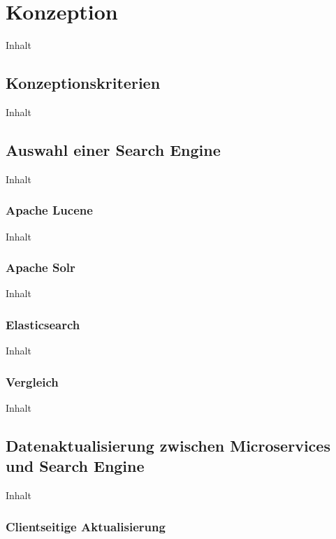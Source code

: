 \chapter{Konzeption\label{chap4:Viertes-Kapitel}}

Inhalt

\section{Konzeptionskriterien\label{sec4.1:Unterpunkt-1}}

Inhalt

\section{Auswahl einer Search Engine\label{sec4.2:Unterpunkt-2}}

Inhalt

\subsection{Apache Lucene\label{subsec4.2.1:Unterunterpunkt-1}}

Inhalt

\subsection{Apache Solr\label{subsec4.2.2:Unterunterpunkt-2}}

Inhalt

\subsection{Elasticsearch\label{subsec4.2.3:Unterunterpunkt-3}}

Inhalt

\subsection{Vergleich\label{subsec4.2.4:Unterunterpunkt-4}}

Inhalt

\section{Datenaktualisierung zwischen Microservices und Search Engine\label{sec4.3:Unterpunkt-3}}

Inhalt

\subsection{Clientseitige Aktualisierung\label{subsec4.3.1:Unterunterpunkt-1}}

